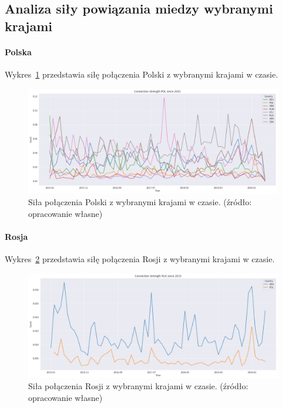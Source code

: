 \documentclass[11pt]{report}
\begin{document}
    \subsection{Analiza siły powiązania miedzy wybranymi krajami}

    \paragraph{Polska}

    Wykres~\ref{fig:PLConnection} przedstawia siłę połączenia Polski z wybranymi krajami w czasie.


    \begin{figure}[!htp]
        \centering
        \includegraphics[width=1 \textwidth]{fig/PL/POLConnection.png}
        \caption{Siła połączenia Polski z wybranymi krajami w czasie. (źródło: opracowanie własne)}
        \label{fig:PLConnection}
    \end{figure}

    \paragraph{Rosja}

    Wykres~\ref{fig:RUSConnection} przedstawia siłę połączenia Rosji z wybranymi krajami w czasie.

    \begin{figure}[!htp]
        \centering
        \includegraphics[width=1 \textwidth]{fig/RUS/RUSConnection.png}
        \caption{Siła połączenia Rosji z wybranymi krajami w czasie. (źródło: opracowanie własne)}
        \label{fig:RUSConnection}
    \end{figure}
\end{document}
